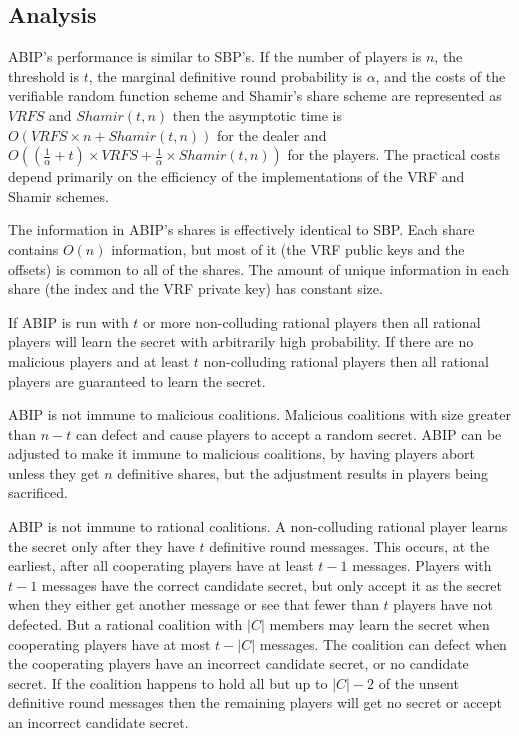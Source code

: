 \documentclass{dalcsthesis}
\begin{document}
\subsection{Analysis}

ABIP's performance is similar to SBP's. If the number of players is $n$, the threshold is $t$, the marginal definitive round probability is $\alpha$, and the costs of the verifiable random function scheme and Shamir's share scheme are represented as $VRFS$ and $Shamir(t, n)$ then the asymptotic time is $O(VRFS \times n + Shamir(t, n))$ for the dealer and $O((\frac{1}{\alpha} + t) \times VRFS + \frac{1}{\alpha} \times Shamir(t, n))$ for the players. The practical costs depend primarily on the efficiency of the implementations of the VRF and Shamir schemes.

The information in ABIP's shares is effectively identical to SBP. Each share contains $O(n)$ information, but most of it (the VRF public keys and the offsets) is common to all of the shares. The amount of unique information in each share (the index and the VRF private key) has constant size.

If ABIP is run with $t$ or more non-colluding rational players then all rational players will learn the secret with arbitrarily high probability. If there are no malicious players and at least $t$ non-colluding rational players then all rational players are guaranteed to learn the secret.

ABIP is not immune to malicious coalitions. Malicious coalitions with size greater than $n-t$ can defect and cause players to accept a random secret. ABIP can be adjusted to make it immune to malicious coalitions, by having players abort unless they get $n$ definitive shares, but the adjustment results in players being sacrificed.

ABIP is not immune to rational coalitions. A non-colluding rational player learns the secret only after they have $t$ definitive round messages. This occurs, at the earliest, after all cooperating players have at least $t-1$ messages. Players with $t-1$ messages have the correct candidate secret, but only accept it as the secret when they either get another message or see that fewer than $t$ players have not defected. But a rational coalition with $|C|$ members may learn the secret when cooperating players have at most $t-|C|$ messages. The coalition can defect when the cooperating players have an incorrect candidate secret, or no candidate secret. If the coalition happens to hold all but up to $|C| - 2$ of the unsent definitive round messages then the remaining players will get no secret or accept an incorrect candidate secret. 
\end{document}
